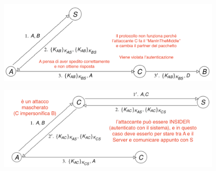 \documentclass[11pt, a4paper, twoside, italian]{report}
\theoremstyle{plain}
\begin{document}
\begin{multicols}{2}
\begin{figure}[H]
	\end{figure}
	\begin{figure}[H]
		\centering
		\includegraphics[scale=0.4]{problem1attempt2}
	\end{figure}
	\begin{figure}[H]
		\centering
		\includegraphics[scale=0.4]{problem2attempt2}
	\end{figure}
\end{multicols}
	
\end{document}
